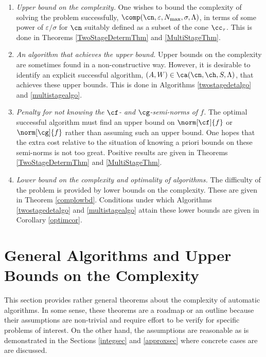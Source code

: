 \documentclass[]{elsarticle}
\theoremstyle{definition}
\theoremstyle{remark}
\begin{document}
\begin{enumerate}

\renewcommand{\labelenumi}{\roman{enumi}.}

\item \emph{Upper bound on the complexity.}
One wishes to bound the complexity of solving the problem successfully, $\comp(\cn,\varepsilon,N_{\max},\sigma,\Lambda)$, in terms of some power of $\varepsilon/\sigma$ for $\cn$ suitably defined as a subset of the cone $\cc_{\tau}$.  This is done in Theorems \ref{TwoStageDetermThm} and \ref{MultiStageThm}.

\item \emph{An algorithm that achieves the upper bound.}  Upper bounds on the complexity are sometimes found in a non-constructive way.  However, it is desirable to identify an explicit successful algorithm, $(A,W) \in \ca(\cn,\ch,S,\Lambda)$, that achieves these upper bounds.  This is done in Algorithms \ref{twostagedetalgo} and \ref{multistagealgo}.

\item \emph{Penalty for not knowing the $\cf$- and $\cg$-semi-norms of $f$.} The optimal successful algorithm must find an upper bound on $\norm[\cf]{f}$ or $\norm[\cg]{f}$ rather than assuming such an upper bound.  One hopes that the extra cost relative to the situation of knowing a priori bounds on these semi-norms is not too great.  Positive results are given in Theorems \ref{TwoStageDetermThm} and \ref{MultiStageThm}.

\item \emph{Lower bound on the complexity and optimality of algorithms.}  The difficulty of the problem is provided by lower bounds on the complexity.  These are given in Theorem \ref{complowbd}.  Conditions under which Algorithms \ref{twostagedetalgo} and \ref{multistagealgo} attain these lower bounds are given in Corollary \ref{optimcor}.

\end{enumerate}

\section{General Algorithms and Upper Bounds on the Complexity} \label{genthmsec}

This section provides rather general theorems about the complexity of automatic algorithms.  In some sense, these theorems are a roadmap or an outline because their assumptions are non-trivial and require effort to be verify for specific problems of interest.  On the other hand, the assumptions are reasonable as is demonstrated in the Sections \ref{integsec} and \ref{approxsec} where concrete cases are are discussed.  
\end{document}

